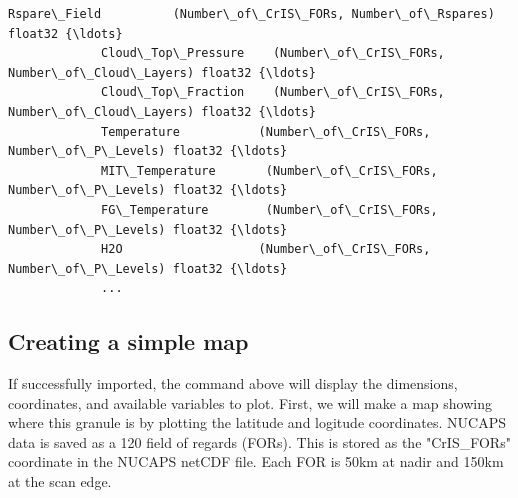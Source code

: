 \documentclass[11pt]{article}
\begin{document}
\begin{Verbatim}[commandchars=\\\{\}]
             Rspare\_Field          (Number\_of\_CrIS\_FORs, Number\_of\_Rspares) float32 {\ldots}
             Cloud\_Top\_Pressure    (Number\_of\_CrIS\_FORs, Number\_of\_Cloud\_Layers) float32 {\ldots}
             Cloud\_Top\_Fraction    (Number\_of\_CrIS\_FORs, Number\_of\_Cloud\_Layers) float32 {\ldots}
             Temperature           (Number\_of\_CrIS\_FORs, Number\_of\_P\_Levels) float32 {\ldots}
             MIT\_Temperature       (Number\_of\_CrIS\_FORs, Number\_of\_P\_Levels) float32 {\ldots}
             FG\_Temperature        (Number\_of\_CrIS\_FORs, Number\_of\_P\_Levels) float32 {\ldots}
             H2O                   (Number\_of\_CrIS\_FORs, Number\_of\_P\_Levels) float32 {\ldots}
             ...
\end{Verbatim}

    \subsection{Creating a simple map}\label{creating-a-simple-map}

If successfully imported, the command above will display the dimensions,
coordinates, and available variables to plot. First, we will make a map
showing where this granule is by plotting the latitude and logitude
coordinates. NUCAPS data is saved as a 120 field of regards (FORs). This
is stored as the "CrIS\_FORs" coordinate in the NUCAPS netCDF file. Each
FOR is 50km at nadir and 150km at the scan edge.
\end{document}
